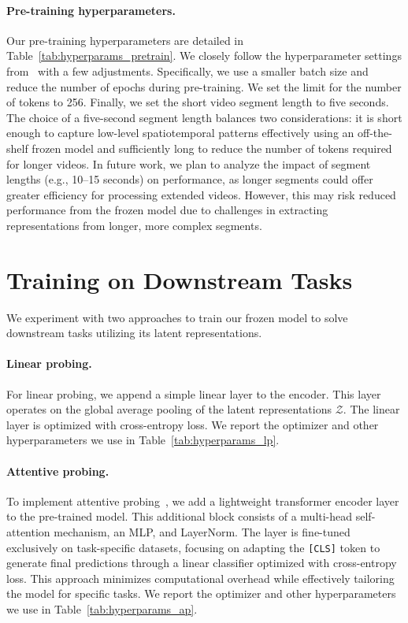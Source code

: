 \paragraph{Pre-training hyperparameters.} 
Our pre-training hyperparameters are detailed in Table~\ref{tab:hyperparams_pretrain}. We closely follow the hyperparameter settings from~\cite{he2022masked} with a few adjustments. Specifically, we use a smaller batch size and reduce the number of epochs during pre-training. We set the limit for the number of tokens to 256. Finally, we set the short video segment length to five seconds.
The choice of a five-second segment length balances two considerations: it is short enough to capture low-level spatiotemporal patterns effectively using an off-the-shelf frozen model and sufficiently long to reduce the number of tokens required for longer videos. In future work, we plan to analyze the impact of segment lengths (e.g., 10–15 seconds) on performance, as longer segments could offer greater efficiency for processing extended videos. However, this may risk reduced performance from the frozen model due to challenges in extracting representations from longer, more complex segments.


\section{Training on Downstream Tasks}
\label{app:results_downstream_tasks}

We experiment with two approaches to train our frozen model to solve downstream tasks utilizing its latent representations.

\paragraph{Linear probing.} For linear probing, we append a simple linear layer to the encoder. This layer operates on the global average pooling of the latent representations $\mathcal{Z}$. The linear layer is optimized with cross-entropy loss. We report the optimizer and other hyperparameters we use in  Table~\ref{tab:hyperparams_lp}.

\paragraph{Attentive probing.} To implement attentive probing~\cite{yu2022coca, lee2019set}, we add a lightweight transformer encoder layer to the pre-trained model. This additional block consists of a multi-head self-attention mechanism, an MLP, and LayerNorm. The layer is fine-tuned exclusively on task-specific datasets, focusing on adapting the \texttt{[CLS]} token to generate final predictions through a linear classifier optimized with cross-entropy loss. This approach minimizes computational overhead while effectively tailoring the model for specific tasks. We report the optimizer and other hyperparameters we use in Table~\ref{tab:hyperparams_ap}.


